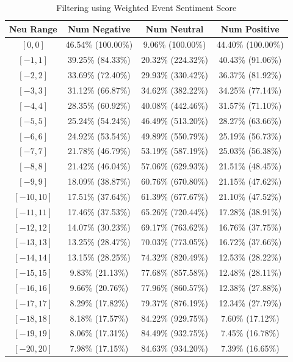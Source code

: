 \documentclass[12pt]{article}
\begin{document}
	\begin{table}[H]
		\small
		\centering
		\caption{Filtering using Weighted Event Sentiment Score}
		\begin{tabular}{c|c c c}
\toprule
Neu Range & Num Negative & Num Neutral & Num Positive \\
\midrule
$[0,0]$ & 46.54\% (100.00\%) & 9.06\% (100.00\%) & 44.40\% (100.00\%) \\
$[-1,1]$ & 39.25\% (84.33\%) & 20.32\% (224.32\%) & 40.43\% (91.06\%) \\
$[-2,2]$ & 33.69\% (72.40\%) & 29.93\% (330.42\%) & 36.37\% (81.92\%) \\
$[-3,3]$ & 31.12\% (66.87\%) & 34.62\% (382.22\%) & 34.25\% (77.14\%) \\
$[-4,4]$ & 28.35\% (60.92\%) & 40.08\% (442.46\%) & 31.57\% (71.10\%) \\
$[-5,5]$ & 25.24\% (54.24\%) & 46.49\% (513.20\%) & 28.27\% (63.66\%) \\
$[-6,6]$ & 24.92\% (53.54\%) & 49.89\% (550.79\%) & 25.19\% (56.73\%) \\
$[-7,7]$ & 21.78\% (46.79\%) & 53.19\% (587.19\%) & 25.03\% (56.38\%) \\
$[-8,8]$ & 21.42\% (46.04\%) & 57.06\% (629.93\%) & 21.51\% (48.45\%) \\
$[-9,9]$ & 18.09\% (38.87\%) & 60.76\% (670.80\%) & 21.15\% (47.62\%) \\
$[-10,10]$ & 17.51\% (37.64\%) & 61.39\% (677.67\%) & 21.10\% (47.52\%) \\
$[-11,11]$ & 17.46\% (37.53\%) & 65.26\% (720.44\%) & 17.28\% (38.91\%) \\
$[-12,12]$ & 14.07\% (30.23\%) & 69.17\% (763.62\%) & 16.76\% (37.75\%) \\
$[-13,13]$ & 13.25\% (28.47\%) & 70.03\% (773.05\%) & 16.72\% (37.66\%) \\
$[-14,14]$ & 13.15\% (28.25\%) & 74.32\% (820.49\%) & 12.53\% (28.22\%) \\
$[-15,15]$ & 9.83\% (21.13\%) & 77.68\% (857.58\%) & 12.48\% (28.11\%) \\
$[-16,16]$ & 9.66\% (20.76\%) & 77.96\% (860.57\%) & 12.38\% (27.88\%) \\
$[-17,17]$ & 8.29\% (17.82\%) & 79.37\% (876.19\%) & 12.34\% (27.79\%) \\
$[-18,18]$ & 8.18\% (17.57\%) & 84.22\% (929.75\%) & 7.60\% (17.12\%) \\
$[-19,19]$ & 8.06\% (17.31\%) & 84.49\% (932.75\%) & 7.45\% (16.78\%) \\
$[-20,20]$ & 7.98\% (17.15\%) & 84.63\% (934.20\%) & 7.39\% (16.65\%) \\

\end{tabular}
\end{table}
\end{document}
